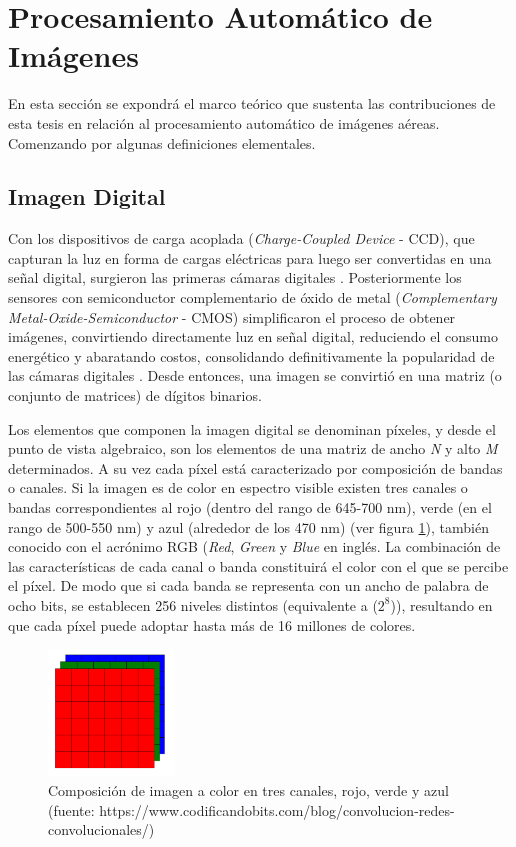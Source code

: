 \section{Procesamiento Automático de Imágenes}

En esta sección se expondrá el marco teórico que sustenta las contribuciones de esta tesis en relación al procesamiento automático de imágenes aéreas. Comenzando por algunas definiciones elementales.

\subsection{Imagen Digital}
Con los dispositivos de carga acoplada (\textit{Charge-Coupled Device} - CCD), que capturan la luz en forma de cargas eléctricas para luego ser convertidas en una señal digital, surgieron las primeras cámaras digitales \cite{dyck_chapter_1982}. Posteriormente los sensores con semiconductor complementario de óxido de metal (\textit{Complementary Metal-Oxide-Semiconductor} - CMOS) simplificaron el proceso de obtener imágenes, convirtiendo directamente luz en señal digital, reduciendo el consumo energético y abaratando costos, consolidando definitivamente la popularidad de las cámaras digitales \cite{fossum_cmos_1997}. Desde entonces, una imagen se convirtió en una matriz (o conjunto de matrices) de dígitos binarios.

Los elementos que componen la imagen digital se denominan píxeles, y desde el punto de vista algebraico, son los elementos de una matriz de ancho \textit{N} y alto \textit{M} determinados. A su vez cada píxel está caracterizado por composición de bandas o canales. Si la imagen es de color en espectro visible existen tres canales o bandas correspondientes al rojo (dentro del rango de 645-700 nm), verde (en el rango de 500-550 nm) y azul (alrededor de los 470 nm) (ver figura \ref{RGB}), también conocido con el acrónimo RGB (\textit{Red}, \textit{Green} y \textit{Blue} en inglés. La combinación de las características de cada canal o banda constituirá el color con el que se percibe el píxel. De modo que si cada banda se representa con un ancho de palabra de ocho bits, se establecen 256 niveles distintos (equivalente a ($2^8$)), resultando en que cada píxel puede adoptar hasta más de 16 millones de colores.


\begin{figure}[h!]
    \includegraphics[width=0.3\textwidth]{Imagenes/imagen-a-color.png}
     \caption{Composición de imagen a color en tres canales, rojo, verde y azul (fuente: https://www.codificandobits.com/blog/convolucion-redes-convolucionales/)}
    \label{RGB}
\end{figure}

